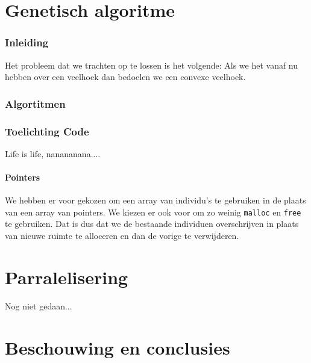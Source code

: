 





\part{Genetisch algoritme}
\section{Inleiding}
\label{sec:inleiding}
Het probleem dat we trachten op te lossen is het volgende: %
Als we het vanaf nu hebben over een veelhoek dan bedoelen we een convexe veelhoek.

\section{Algortitmen}





\section{Toelichting Code}
Life is life, nanananana....
\label{sec:explainationcode}
\subsection{Pointers}
\label{sub:pointer}
We hebben er voor gekozen om een array van individu's te gebruiken in de plaats van een array van pointers. We kiezen er ook voor om zo weinig \texttt{malloc} en \texttt{free} te gebruiken. Dat is dus dat we de bestaande individuen overschrijven in plaats van nieuwe ruimte te alloceren en dan de vorige te verwijderen.

\part{Parralelisering}
Nog niet gedaan...

\part{Beschouwing en conclusies}


